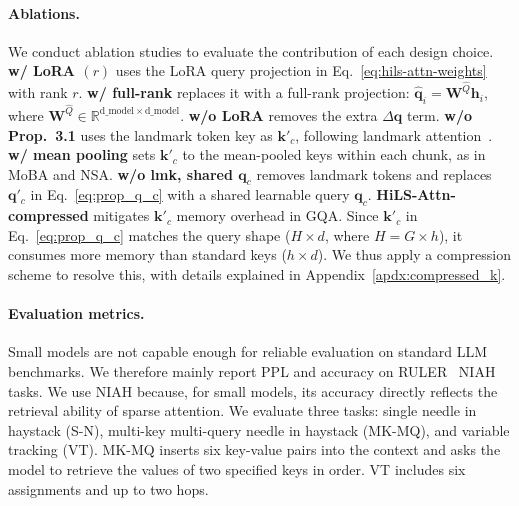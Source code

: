 \paragraph{Ablations.}
We conduct ablation studies to evaluate the contribution of each design choice.
\textbf{w/ LoRA $(r)$} uses the LoRA query projection in Eq.~\ref{eq:hils-attn-weights} with rank $r$.
\textbf{w/ full-rank} replaces it with a full-rank projection:
$\hat{\mathbf{q}}_i=\mathbf{W}^{\hat{Q}}\mathbf{h}_i$,
where $\mathbf{W}^{\hat{Q}}\in\mathbb{R}^{\mathrm{d\_model}\times\mathrm{d\_model}}$.
\textbf{w/o LoRA} removes the extra $\Delta\mathbf{q}$ term.
\textbf{w/o Prop.~3.1} uses the landmark token key as $\mathbf{k}'_c$, following landmark attention~\cite{mohtashami2023random}.
\textbf{w/ mean pooling} sets $\mathbf{k}'_c$ to the mean-pooled keys within each chunk, as in MoBA and NSA.
\textbf{w/o lmk, shared $\mathbf{q}_c$} removes landmark tokens and replaces $\mathbf{q}'_c$ in Eq.~\ref{eq:prop_q_c} with a shared learnable query $\mathbf{q}_c$. 
\textbf{HiLS-Attn-compressed} mitigates $\mathbf{k}'_c$ memory overhead in GQA. Since $\mathbf{k}'_c$ in Eq.~\ref{eq:prop_q_c} matches the query shape ($H \times d$, where $H = G \times h$), it consumes more memory than standard keys ($h \times d$). We thus apply a compression scheme to resolve this, with details explained in Appendix~\ref{apdx:compressed_k}.

\paragraph{Evaluation metrics.}
Small models are not capable enough for reliable evaluation on standard LLM benchmarks. We therefore mainly report PPL and accuracy on RULER~\cite{hsieh2024ruler} NIAH tasks. We use NIAH because, for small models, its accuracy directly reflects the retrieval ability of sparse attention.
We evaluate three tasks: single needle in haystack (S-N), multi-key multi-query needle in haystack (MK-MQ), and variable tracking (VT). MK-MQ inserts six key-value pairs into the context and asks the model to retrieve the values of two specified keys in order. VT includes six assignments and up to two hops.




